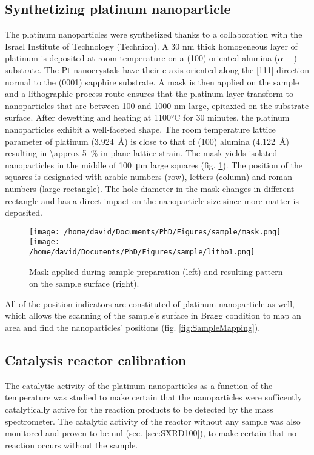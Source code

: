 \subsection{Synthetizing platinum nanoparticle}

The platinum nanoparticles were synthetized thanks to a collaboration with the Israel Institute of Technology (Technion).
A 30 nm thick homogeneous layer of platinum is deposited at room temperature on a (100) oriented alumina ($\alpha-$) substrate.
The Pt nanocrystals have their c-axis oriented along the [111] direction normal to the (0001) sapphire substrate.
A mask is then applied on the sample and a lithographic process route ensures that the platinum layer transform to nanoparticles that are between 100 and 1000 nm large,  epitaxied on the substrate surface.
After dewetting and heating at 1100°C for 30 minutes, the platinum nanoparticles exhibit a well-faceted shape.
The room temperature lattice parameter of platinum (\qty{3.924}{\angstrom}) is close to that of (100) alumina (\qty{4.122}{\angstrom}) resulting in \qty{\approx 5}{\percent} in-plane lattice strain.
The mask yields isolated nanoparticles in the middle of \qty{100}{\um} large squares (fig. \ref{fig:Mask}).
The position of the squares is designated with arabic numbers (row), letters (column) and roman numbers (large rectangle).
The hole diameter in the mask changes in different rectangle and has a direct impact on the nanoparticle size since more matter is deposited.

\begin{figure}[!htb]
    \centering
    \texttt{[image: /home/david/Documents/PhD/Figures/sample/mask.png]}
    \texttt{[image: /home/david/Documents/PhD/Figures/sample/litho1.png]}
    \caption{
    	Mask applied during sample preparation (left) and resulting pattern on the sample surface (right).
    }
    \label{fig:Mask}
\end{figure}

All of the position indicators are constituted of platinum nanoparticle as well, which allows the scanning of the sample's surface in Bragg condition to map an area and find the nanoparticles' positions (fig. \ref{fig:SampleMapping}).

\subsection{Catalysis reactor calibration}

The catalytic activity of the platinum nanoparticles as a function of the temperature was studied to make certain that the nanoparticles were sufficently catalytically active for the reaction products to be detected by the mass spectrometer.
The catalytic activity of the reactor without any sample was also monitored and proven to be nul (sec. \ref{sec:SXRD100}), to make certain that no reaction occurs without the sample.

